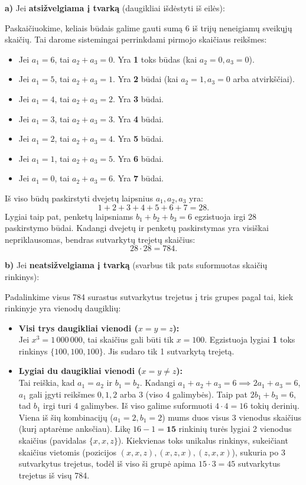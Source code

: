 \documentclass[11pt,a4paper]{article}
\begin{document}
\begin{enumerate}
    \textbf{a)} Jei \textbf{atsižvelgiama į tvarką} (daugikliai išdėstyti iš eilės):
    
    Paskaičiuokime, keliais būdais galime gauti sumą 6 iš trijų neneigiamų sveikųjų skaičių. Tai darome sistemingai perrinkdami pirmojo skaičiaus reikšmes:
    \begin{itemize}
        \item Jei $a_1 = 6$, tai $a_2 + a_3 = 0$. Yra \textbf{1} toks būdas (kai $a_2=0, a_3=0$).
        \item Jei $a_1 = 5$, tai $a_2 + a_3 = 1$. Yra \textbf{2} būdai (kai $a_2=1, a_3=0$ arba atvirkščiai).
        \item Jei $a_1 = 4$, tai $a_2 + a_3 = 2$. Yra \textbf{3} būdai.
        \item Jei $a_1 = 3$, tai $a_2 + a_3 = 3$. Yra \textbf{4} būdai.
        \item Jei $a_1 = 2$, tai $a_2 + a_3 = 4$. Yra \textbf{5} būdai.
        \item Jei $a_1 = 1$, tai $a_2 + a_3 = 5$. Yra \textbf{6} būdai.
        \item Jei $a_1 = 0$, tai $a_2 + a_3 = 6$. Yra \textbf{7} būdai.
    \end{itemize}
    Iš viso būdų paskirstyti dvejetų laipsnius $a_1, a_2, a_3$ yra:
    \[ 1 + 2 + 3 + 4 + 5 + 6 + 7 = 28. \]
    Lygiai taip pat, penketų laipsniams $b_1 + b_2 + b_3 = 6$ egzistuoja irgi 28 paskirstymo būdai.
    Kadangi dvejetų ir penketų paskirstymas yra visiškai nepriklausomas, bendras sutvarkytų trejetų skaičius:
    \[ 28 \cdot 28 = 784. \]
    
    \textbf{b)} Jei \textbf{neatsižvelgiama į tvarką} (svarbus tik pats suformuotas skaičių rinkinys):
    
    Padalinkime visus 784 surastus sutvarkytus trejetus į tris grupes pagal tai, kiek rinkinyje yra vienodų daugiklių:
    \begin{itemize}
        \item \textbf{Visi trys daugikliai vienodi ($x = y = z$):} \\
        Jei $x^3 = 1\,000\,000$, tai skaičius gali būti tik $x=100$. Egzistuoja lygiai \textbf{1} toks rinkinys $\{100, 100, 100\}$. Jis sudaro tik 1 sutvarkytą trejetą.
        
        \item \textbf{Lygiai du daugikliai vienodi ($x = y \neq z$):} \\
        Tai reiškia, kad $a_1 = a_2$ ir $b_1 = b_2$.
        Kadangi $a_1 + a_2 + a_3 = 6 \implies 2a_1 + a_3 = 6$, $a_1$ gali įgyti reikšmes $0, 1, 2$ arba $3$ (viso 4 galimybės).
        Taip pat $2b_1 + b_3 = 6$, tad $b_1$ irgi turi 4 galimybes.
        Iš viso galime suformuoti $4 \cdot 4 = 16$ tokių derinių. Viena iš šių kombinacijų ($a_1=2, b_1=2$) mums duos visus 3 vienodus skaičius (kurį aptarėme anksčiau). 
        Likę $16 - 1 = \textbf{15}$ rinkinių turės lygiai 2 vienodus skaičius (pavidalas $\{x, x, z\}$). 
        Kiekvienas toks unikalus rinkinys, sukeičiant skaičius vietomis (pozicijos $(x,x,z), (x,z,x), (z,x,x)$), sukuria po 3 sutvarkytus trejetus, todėl iš viso ši grupė apima $15 \cdot 3 = 45$ sutvarkytus trejetus iš visų 784.
        

\end{itemize}
\end{enumerate}
\end{document}
